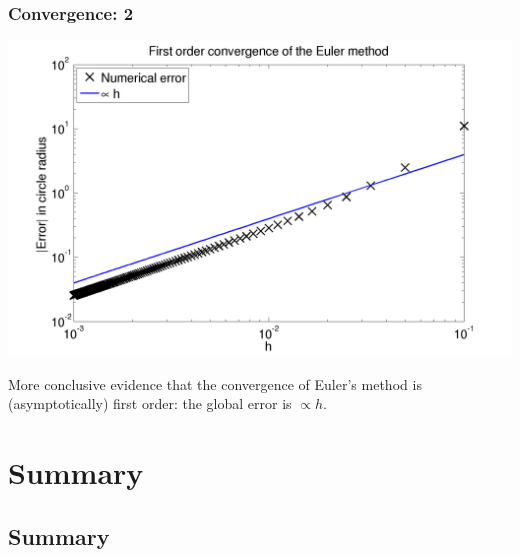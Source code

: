 \documentclass{beamer}
\begin{document}
\begin{frame}
  \frametitle{Convergence: 2}

  \begin{center}
    \includegraphics[height=0.7\textheight]{figures/EulerCircleConvergence}
  \end{center}
  More conclusive evidence that the convergence of Euler's method is
  (asymptotically) first order: the global error is $\propto h$.

\end{frame}


\section{Summary}

\subsection{Summary}
\end{document}
